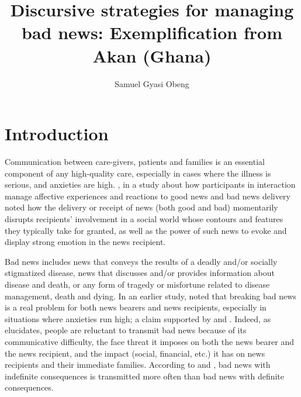 \documentclass[output=paper,colorlinks,citecolor=brown]{langscibook}
\author{Samuel Gyasi Obeng\affiliation{Indiana University}}
\title[Discursive strategies for managing bad news]
      {Discursive strategies for managing bad news: Exemplification from Akan (Ghana)}
\begin{document}
\maketitle

\section{Introduction}\label{sec:obeng:1}\largerpage

Communication between care-givers, patients and families is an essential component of any high-quality care, especially in cases where the illness is serious, and anxieties are high. \citet{MaynardFreese2012}, in a study about how participants in interaction manage affective experiences and reactions to good news and bad news delivery noted how the delivery or receipt of news (both good and bad) momentarily disrupts recipients’ involvement in a social world whose contours and features they typically take for granted, as well as the power of such news to evoke and display strong emotion in the news recipient. 

Bad news includes news that conveys the results of a deadly and/or socially stigmatized disease, news that discusses and/or provides information about disease and death, or any form of tragedy or misfortune related to disease management, death and dying. In an earlier study, \citet{Maynard2003} noted that breaking bad news is a real problem for both news bearers and news recipients, especially in situations where anxieties run high; a claim supported by \citet{FallowfieldJenkins2004} and \citet{BrownEtAl2009}. Indeed, as \citet{Maynard2003} elucidates, people are reluctant to transmit bad news because of its communicative difficulty, the face threat it imposes on both the news bearer and the news recipient, and the impact (social, financial, etc.) it has on news recipients and their immediate families. According to \citet{TesserRosen1975} and \citet{WeenigEtAl2014, WeenigEtAl2001}, bad news with indefinite consequences is transmitted more often than bad news with definite consequences.
\end{document}
